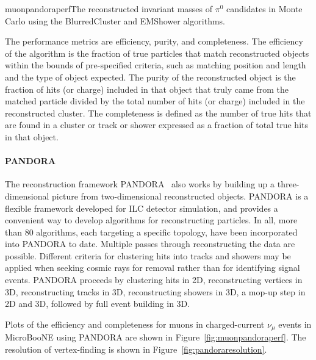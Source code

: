 \begin{cdrfigure}{muonpandoraperf}{The reconstructed invariant masses of $\pi^0$ candidates in
  Monte Carlo using the BlurredCluster and EMShower algorithms.}
\end{cdrfigure}

The performance metrics are efficiency, purity, and completeness.  The
efficiency of the algorithm is the fraction of true particles that
match reconstructed objects within the bounds of pre-specified
criteria, such as matching position and length and the type of object
expected.  The purity of the reconstructed object is the fraction of
hits (or charge) included in that object that truly came from the
matched particle divided by the total number of hits (or charge)
included in the reconstructed cluster.  The completeness is defined as
the number of true hits that are found in a cluster or track or shower
expressed as a fraction of total true hits in that object.

\paragraph{PANDORA}
The reconstruction framework PANDORA~\cite{pandora} also works by
building up a three-dimensional picture from two-dimensional
reconstructed objects.  PANDORA is a flexible framework developed for
ILC detector simulation, and provides a convenient way to develop
algorithms for reconstructing particles.  In all, more than 80
algorithms, each targeting a specific topology, have been incorporated
into PANDORA to date.  Multiple passes through reconstructing the data
are possible.  Different criteria for clustering hits into tracks and
showers may be applied when seeking cosmic rays for removal rather than for
identifying signal events.  PANDORA proceeds by clustering hits in 2D,
reconstructing vertices in 3D, reconstructing tracks in 3D,
reconstructing showers in 3D, a mop-up step in 2D and 3D, followed by
full event building in 3D.

  Plots of
the efficiency and completeness for muons in charged-current $\nu_{\mu}$
events in MicroBooNE using PANDORA are shown in Figure~\ref{fig:muonpandoraperf}.
The resolution of vertex-finding is shown in
Figure~\ref{fig:pandoraresolution}.

